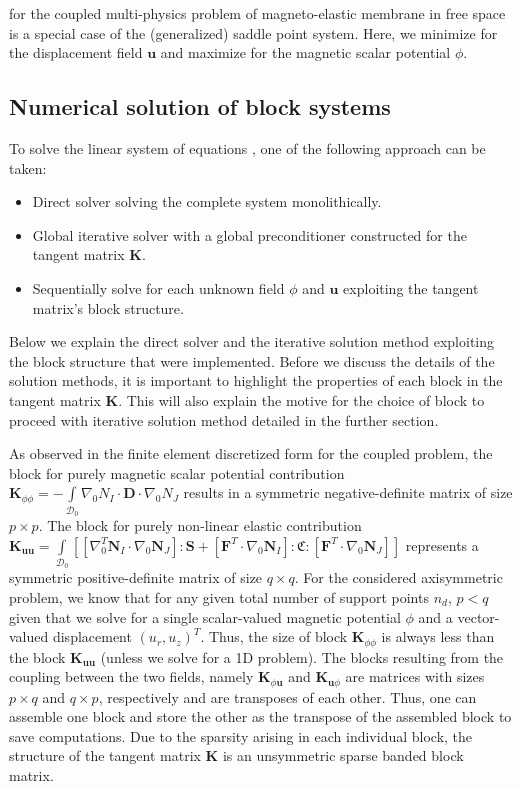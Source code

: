  for the coupled multi-physics problem of magneto-elastic membrane in free space is a special case of the (generalized) saddle point system. Here, we minimize for the displacement field $\mathbf{u}$ and maximize for the magnetic scalar potential $\phi$.

\subsection{Numerical solution of block systems}

To solve the linear system of equations , one of the following approach can be taken:
\begin{itemize}
\item Direct solver solving the complete system monolithically.
\item Global iterative solver with a global preconditioner constructed for the tangent matrix $\mathbf{K}$.
\item Sequentially solve for each unknown field $\phi$ and $\mathbf{u}$ exploiting the tangent matrix's block structure.
\end{itemize}
Below we explain the direct solver and the iterative solution method exploiting the block structure that were implemented. Before we discuss the details of the solution methods, it is important to highlight the properties of each block in the tangent matrix $\mathbf{K}$. This will also explain the motive for the choice of block to proceed with iterative solution method detailed in the further section.\par 

As observed in the finite element discretized form for the coupled problem, the block for purely magnetic scalar potential contribution $\mathbf{K}_{\phi \phi} = - \int\limits_{\mathcal{D}_0} \nabla_0 N_I \cdot \mathbf{D} \cdot \nabla_0 N_J$ results in a symmetric negative-definite matrix of size $p \times p$. The block for purely non-linear elastic contribution $\mathbf{K}_{\mathbf{u} \mathbf{u}} = \int\limits_{\mathcal{D}_0} \left[ \left[ \nabla_0^T \mathbf{N}_I \cdot \nabla_0 \mathbf{N}_J \right] : \mathbf{S} + \left[ \mathbf{F}^T \cdot \nabla_0 \mathbf{N}_I \right] : \mathfrak{C} : \left[ \mathbf{F}^T \cdot \nabla_0 \mathbf{N}_J \right] \right]$ represents a symmetric positive-definite matrix of size $q \times q$. For the considered axisymmetric problem, we know that for any given total number of support points $n_d$, $p < q$ given that we solve for a single scalar-valued magnetic potential $\phi$ and a vector-valued displacement $(u_r, u_z)^T$. Thus, the size of block $\mathbf{K}_{\phi \phi}$ is always less than the block $\mathbf{K}_{\mathbf{u} \mathbf{u}}$ (unless we solve for a 1D problem). The blocks resulting from the coupling between the two fields, namely $\mathbf{K}_{\phi \mathbf{u}}$ and $\mathbf{K}_{\mathbf{u} \phi}$ are matrices with sizes $p \times q$ and $q \times p$, respectively and are transposes of each other. Thus, one can assemble one block and store the other as the transpose of the assembled block to save computations. Due to the sparsity arising in each individual block, the structure of the tangent matrix $\mathbf{K}$ is an unsymmetric sparse banded block matrix.\par 

